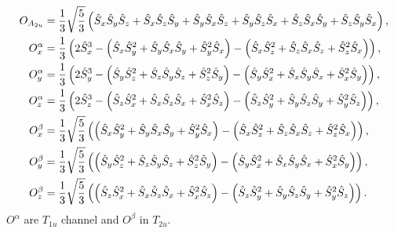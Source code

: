 \documentclass[11pt, aps, longbibliography]{article}
\begin{document}
        \begin{align}
            O_{A_{2u}} &= \frac{1}{3}\sqrt{\frac{5}{3}} \left( \hat{S}_x\hat{S}_y\hat{S}_z + \hat{S}_x\hat{S}_z\hat{S}_y + \hat{S}_y\hat{S}_x\hat{S}_z + \hat{S}_y\hat{S}_z\hat{S}_x + \hat{S}_z\hat{S}_x\hat{S}_y + \hat{S}_z\hat{S}_y\hat{S}_x \right), \notag \\
            O_x^\alpha &= \frac{1}{3} \left( 2\hat{S}_x^3 -\left(\hat{S}_x\hat{S}_y^2+\hat{S}_y\hat{S}_x\hat{S}_y + \hat{S}_y^2\hat{S}_x\right) - \left(\hat{S}_x\hat{S}_z^2 + \hat{S}_z\hat{S}_x\hat{S}_z + \hat{S}_z^2\hat{S}_x\right) \right), \notag \\
            O_y^\alpha &= \frac{1}{3} \left( 2\hat{S}_y^3 -\left(\hat{S}_y\hat{S}_z^2+\hat{S}_z\hat{S}_y\hat{S}_z + \hat{S}_z^2\hat{S}_y\right) - \left(\hat{S}_y\hat{S}_x^2 + \hat{S}_x\hat{S}_y\hat{S}_x + \hat{S}_x^2\hat{S}_y\right) \right), \notag \\
            O_z^\alpha &= \frac{1}{3} \left( 2\hat{S}_z^3 -\left(\hat{S}_z\hat{S}_x^2+\hat{S}_x\hat{S}_z\hat{S}_x + \hat{S}_x^2\hat{S}_z\right) - \left(\hat{S}_z\hat{S}_y^2 + \hat{S}_y\hat{S}_z\hat{S}_y + \hat{S}_y^2\hat{S}_z\right) \right), \\
            O_x^\beta &= \frac{1}{3}\sqrt{\frac{5}{3}} \left( \left(\hat{S}_x\hat{S}_y^2+\hat{S}_y\hat{S}_x\hat{S}_y + \hat{S}_y^2\hat{S}_x\right) - \left(\hat{S}_x\hat{S}_z^2 + \hat{S}_z\hat{S}_x\hat{S}_z + \hat{S}_z^2\hat{S}_x\right) \right), \notag \\
            O_y^\beta &= \frac{1}{3}\sqrt{\frac{5}{3}} \left(\left(\hat{S}_y\hat{S}_z^2+\hat{S}_z\hat{S}_y\hat{S}_z + \hat{S}_z^2\hat{S}_y\right) - \left(\hat{S}_y\hat{S}_x^2 + \hat{S}_x\hat{S}_y\hat{S}_x + \hat{S}_x^2\hat{S}_y\right) \right), \notag \\
            O_z^\beta &= \frac{1}{3}\sqrt{\frac{5}{3}} \left(\left(\hat{S}_z\hat{S}_x^2+\hat{S}_x\hat{S}_z\hat{S}_x + \hat{S}_x^2\hat{S}_z\right) - \left(\hat{S}_z\hat{S}_y^2 + \hat{S}_y\hat{S}_z\hat{S}_y + \hat{S}_y^2\hat{S}_z\right) \right). \notag 
        \end{align}
        $O^\alpha$ are $T_{1u}$ channel and $O^\beta$ in $T_{2u}$.
\end{document}
